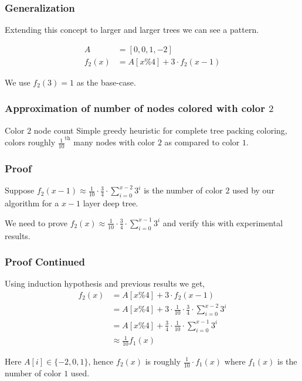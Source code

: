\begin{frame}
    \frametitle{Generalization}

    Extending this concept to larger and larger trees we can see a pattern.
    
    \pause[]

    \begin{align*}
        A &= [0, 0, 1, -2]\\
        f_2(x) &= A[x \% 4] + 3 \cdot f_2(x - 1)
    \end{align*}


    \pause[]

    We use $f_2(3) = 1$ as the base-case. 

\end{frame}

\begin{frame}
    \frametitle{Approximation of number of nodes colored with color $2$}

    \begin{lemm}{Color $2$ node count}{}
        Simple greedy heuristic for complete tree packing coloring, colors roughly $\frac{1}{10} ^{\text{th}}$ many nodes with color $2$ as compared to color $1$.
    \end{lemm}

\end{frame}

\begin{frame}
    \frametitle{Proof}

    \begin{hypothesis}{}{}
        Suppose $f_2(x - 1) \approx \frac{1}{10} \cdot \frac{3}{4} \cdot \displaystyle\sum_{i = 0} ^{x - 2} 3^i$ is the number of color $2$ used by our algorithm for a $x - 1$ layer deep tree. 
    \end{hypothesis}

    We need to prove $f_2(x) \approx \frac{1}{10} \cdot \frac{3}{4} \cdot \displaystyle\sum_{i = 0} ^{x - 1} 3^i$ and verify this with experimental results.
\end{frame}

\begin{frame}
    \frametitle{Proof Continued}

    Using induction hypothesis and previous results we get,
    \begin{align*}
        f_2(x) &= A[x\%4] + 3 \cdot f_2(x - 1)\\
        &= A[x\%4] + 3 \cdot \frac{1}{10} \cdot \frac{3}{4} \cdot \displaystyle\sum_{i = 0} ^{x - 2} 3^i\\
        &= A[x\%4] + \frac{3}{4} \cdot \frac{1}{10} \cdot \displaystyle\sum_{i = 0} ^{x - 1} 3^i\\
        &\approx \frac{1}{10} f_1(x)
    \end{align*}

    Here $A[i] \in \{-2, 0, 1\}$, hence $f_2(x)$ is roughly $\frac{1}{10} \cdot f_1(x)$ where $f_1(x)$ is the number of color $1$ used.    

\end{frame}

